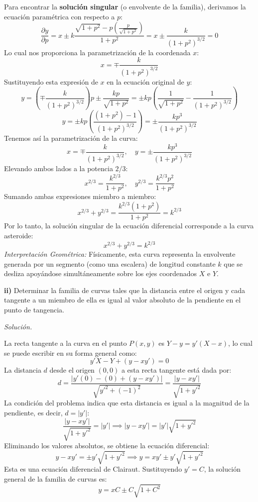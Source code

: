 \documentclass[12pt,letterpaper]{article}
\begin{document}
Para encontrar la \textbf{solución singular} (o envolvente de la familia), derivamos la ecuación paramétrica con respecto a $p$:
\[
  \frac{\partial y}{\partial p} = x \pm k \frac{\sqrt{1+p^2} - p \left( \frac{p}{\sqrt{1+p^2}} \right)}{1+p^2} = x \pm \frac{k}{(1+p^2)^{3/2}} = 0
\]
Lo cual nos proporciona la parametrización de la coordenada $x$:
\[
  x = \mp \frac{k}{(1+p^2)^{3/2}}
\]
Sustituyendo esta expresión de $x$ en la ecuación original de $y$:
\[
  y = \left( \mp \frac{k}{(1+p^2)^{3/2}} \right) p \pm \frac{k p}{\sqrt{1+p^2}} = \pm k p \left( \frac{1}{\sqrt{1+p^2}} - \frac{1}{(1+p^2)^{3/2}} \right)
\]
\[
  y = \pm k p \left( \frac{(1+p^2) - 1}{(1+p^2)^{3/2}} \right) = \pm \frac{k p^3}{(1+p^2)^{3/2}}
\]
Tenemos así la parametrización de la curva:
\[
  x = \mp \frac{k}{(1+p^2)^{3/2}}, \quad y = \pm \frac{k p^3}{(1+p^2)^{3/2}}
\]
Elevando ambos lados a la potencia $2/3$:
\[
  x^{2/3} = \frac{k^{2/3}}{1+p^2}, \quad y^{2/3} = \frac{k^{2/3} p^2}{1+p^2}
\]
Sumando ambas expresiones miembro a miembro:
\[
  x^{2/3} + y^{2/3} = \frac{k^{2/3} (1 + p^2)}{1+p^2} = k^{2/3}
\]
Por lo tanto, la solución singular de la ecuación diferencial corresponde a la curva asteroide:
\[
  x^{2/3} + y^{2/3} = k^{2/3}
\]
\textit{Interpretación Geométrica:} Físicamente, esta curva representa la envolvente generada por un segmento (como una escalera) de longitud constante $k$ que se desliza apoyándose simultáneamente sobre los ejes coordenados $X$ e $Y$.

\medskip
\textbf{ii)} Determinar la familia de curvas tales que la distancia entre el origen y cada tangente a un miembro de ella es igual al valor absoluto de la pendiente en el punto de tangencia.

\medskip
\textit{Solución.}

La recta tangente a la curva en el punto $P(x,y)$ es $Y - y = y'(X - x)$, lo cual se puede escribir en su forma general como:
\[
  y' X - Y + (y - x y') = 0
\]
La distancia $d$ desde el origen $(0,0)$ a esta recta tangente está dada por:
\[
  d = \frac{|y' (0) - (0) + (y - x y')|}{\sqrt{y'^2 + (-1)^2}} = \frac{|y - x y'|}{\sqrt{1 + y'^2}}
\]
La condición del problema indica que esta distancia es igual a la magnitud de la pendiente, es decir, $d = |y'|$:
\[
  \frac{|y - x y'|}{\sqrt{1 + y'^2}} = |y'| \implies |y - x y'| = |y'| \sqrt{1 + y'^2}
\]
Eliminando los valores absolutos, se obtiene la ecuación diferencial:
\[
  y - x y' = \pm y' \sqrt{1 + y'^2} \implies y = x y' \pm y' \sqrt{1 + y'^2}
\]
Esta es una ecuación diferencial de Clairaut. Sustituyendo $y' = C$, la solución general de la familia de curvas es:
\[
  y = x C \pm C \sqrt{1 + C^2}
\]
\end{document}
